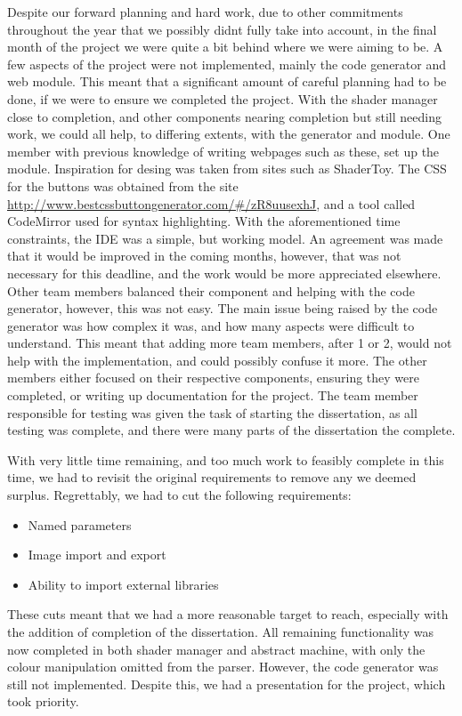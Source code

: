 \documentclass{l3proj}
\begin{document}
Despite our forward planning and hard work, due to other commitments throughout the year that we possibly didnt fully take into account, in the final month of the project we were quite a bit behind where we were aiming to be. A few aspects of the project were not implemented, mainly the code generator and web module. This meant that a significant amount of careful planning had to be done, if we were to ensure we completed the project. With the shader manager close to completion, and other components nearing completion but still needing work, we could all help, to differing extents, with the generator and module. One member with previous knowledge of writing webpages such as these, set up the module. Inspiration for desing was taken from sites such as ShaderToy. The CSS for the buttons was obtained from the site \url{http://www.bestcssbuttongenerator.com/#/zR8uusexhJ}, and a tool called CodeMirror used for syntax highlighting. With the aforementioned time constraints, the IDE was a simple, but working model. An agreement was made that it would be improved in the coming months, however, that was not necessary for this deadline, and the work would be more appreciated elsewhere. Other team members balanced their component and helping with the code generator, however, this was not easy. The main issue being raised by the code generator was how complex it was, and how many aspects were difficult to understand. This meant that adding more team members, after 1 or 2, would not help with the implementation, and could possibly confuse it more. The other members either focused on their respective components, ensuring they were completed, or writing up documentation for the project. The team member responsible for testing was given the task of starting the dissertation, as all testing was complete, and there were many parts of the dissertation the complete.

With very little time remaining, and too much work to feasibly complete in this time, we had to revisit the original requirements to remove any we deemed surplus. Regrettably, we had to cut the following requirements:
\begin{itemize}
\item Named parameters
\item Image import and export
\item Ability to import external libraries
\end{itemize}
These cuts meant that we had a more reasonable target to reach, especially with the addition of completion of the dissertation. All remaining functionality was now completed in both shader manager and abstract machine, with only the colour manipulation omitted from the parser. However, the code generator was still not implemented. Despite this, we had a presentation for the project, which took priority.
\end{document}
